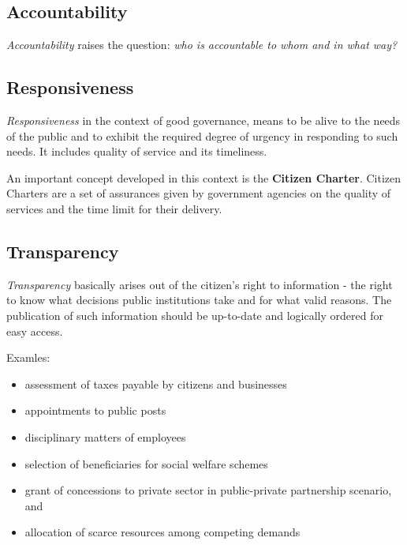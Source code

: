 \subsection*{Accountability}
\textit{Accountability} raises the question: \textit{who is accountable to whom and in what way?}

\subsection*{Responsiveness}
\textit{Responsiveness} in the context of good governance, means to be alive to the needs of the public and to exhibit the required degree of urgency in responding to such needs. It includes quality of service and its timeliness. 

An important concept developed in this context is the \textbf{Citizen Charter}. Citizen Charters are a set of assurances given by government agencies on the quality of services and the time limit for their delivery.

\subsection*{Transparency}
\textit{Transparency} basically arises out of the citizen's right to information - the right to know what decisions public institutions take and for what valid reasons. The publication of such information should be up-to-date and logically ordered for easy access.

Examles: 

	\begin{itemize}
		\item assessment of taxes payable by citizens and businesses
		\item appointments to public posts
		\item disciplinary matters of employees
		\item selection of beneficiaries for social welfare schemes
		\item grant of concessions to private sector in public-private partnership scenario, and 
		\item allocation of scarce resources among competing demands
	\end{itemize}
	


